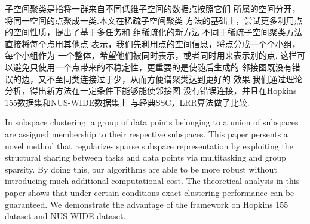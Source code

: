 ﻿\begin{cnabstract}
  子空间聚类是指将一群来自不同低维子空间的数据点按照它们
  所属的空间分开，将同一空间的点聚成一类.本文在稀疏子空间聚类
  方法的基础上，尝试更多利用点的空间性质，提出了基于多任务和
  组稀疏化的新方法.不同于稀疏子空间聚类方法直接将每个点用其他点
  表示，我们先利用点的空间信息，将点分成一个个小组，每个小组作为
  一个整体，希望他们被同时表示，或者同时用来表示别的点.
  这样可以避免只使用一个点带来的不稳定性，更重要的是使随后生成的
  邻接图既没有错误的边，又不至同类连接过于少，从而方便谱聚类达到更好的
  效果.我们通过理论分析，得出新方法在一定条件下能够能使邻接图
  没有错误连接，并且在Hopkins 155数据集和NUS-WIDE数据集上
  与经典SSC，LRR算法做了比较.

\end{cnabstract}

\begin{enabstract}
  In subspace clustering, a group of data points belonging
  to a union of subspaces are assigned membership to their
  respective subspaces. This paper persents a novel method
  that regularizes sparse subspace representation by exploiting the
  structural sharing between tasks and data points via multitasking
  and group sparsity. By doing this, our algorithms are able to be more robust
  without introducing much additional computational cost. The
  theoretical analysis in this paper shows that under certain conditions
  exact clustering performance can be guaranteed. We demonstrate
  the advantage of the framework on Hopkins 155 dataset and NUS-WIDE dataset.

\end{enabstract}
